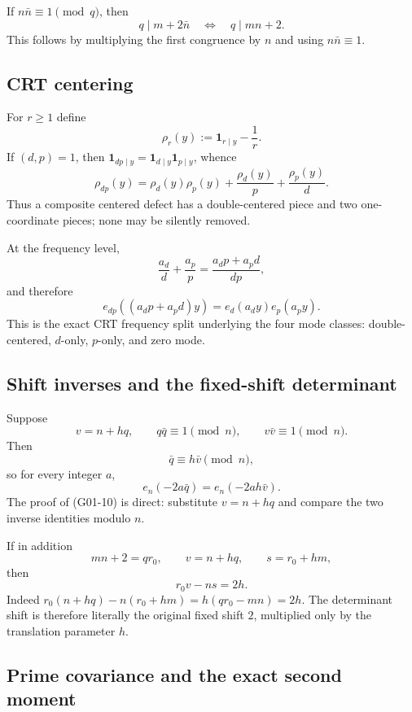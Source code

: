 \documentclass[11pt]{article}
\theoremstyle{definition}
\theoremstyle{remark}
\newcommand{\1}{\mathbf 1}
\begin{document}
If $n\bar n\equiv1\pmod q$, then
\[
 \boxed{q\mid m+2\bar n\quad\Longleftrightarrow\quad q\mid mn+2.}
\tag{G01-6}
\]
This follows by multiplying the first congruence by $n$ and using $n\bar n\equiv1$.

\subsection{CRT centering}

For $r\ge1$ define
\[
 \rho_r(y):=\1_{r\mid y}-\frac1r.
\]
If $(d,p)=1$, then $\1_{dp\mid y}=\1_{d\mid y}\1_{p\mid y}$, whence
\[
 \boxed{
 \rho_{dp}(y)=\rho_d(y)\rho_p(y)+\frac{\rho_d(y)}p+\frac{\rho_p(y)}d.}
\tag{G01-7}
\]
Thus a composite centered defect has a double-centered piece and two one-coordinate pieces; none may be silently
removed.

At the frequency level,
\[
 \frac{a_d}{d}+\frac{a_p}{p}=\frac{a_dp+a_pd}{dp},
\tag{G01-8}
\]
and therefore
\[
 \boxed{e_{dp}((a_dp+a_pd)y)=e_d(a_dy)e_p(a_py).}
\tag{G01-9}
\]
This is the exact CRT frequency split underlying the four mode classes: double-centered, $d$-only, $p$-only,
and zero mode.

\subsection{Shift inverses and the fixed-shift determinant}

Suppose
\[
 v=n+hq,
 \qquad q\bar q\equiv1\pmod n,
 \qquad v\bar v\equiv1\pmod n.
\]
Then
\[
 \boxed{\bar q\equiv h\bar v\pmod n,}
\tag{G01-10}
\]
so for every integer $a$,
\[
 e_n(-2a\bar q)=e_n(-2ah\bar v).
\tag{G01-11}
\]
The proof of (G01-10) is direct: substitute $v=n+hq$ and compare the two inverse identities modulo $n$.

If in addition
\[
 mn+2=qr_0,
 \qquad v=n+hq,
 \qquad s=r_0+hm,
\]
then
\[
 \boxed{r_0v-ns=2h.}
\tag{G01-12}
\]
Indeed
$r_0(n+hq)-n(r_0+hm)=h(qr_0-mn)=2h$.
The determinant shift is therefore literally the original fixed shift $2$, multiplied only by the translation
parameter $h$.

\subsection{Prime covariance and the exact second moment}
\end{document}
